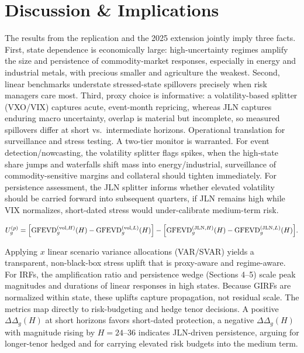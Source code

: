 \documentclass[
  11pt,
]{article}
\begin{document}
\section{Discussion \& Implications}\label{sec:discussion}

The results from the replication and the 2025 extension jointly imply three facts. First, state dependence is economically large: high-uncertainty regimes amplify the size and persistence of commodity-market responses, especially in energy and industrial metals, with precious smaller and agriculture the weakest. Second, linear benchmarks understate stressed-state spillovers precisely when risk managers care most. Third, proxy choice is informative: a volatility-based splitter (VXO/VIX) captures acute, event-month repricing, whereas JLN captures enduring macro uncertainty, overlap is material but incomplete, so measured spillovers differ at short vs.~intermediate horizons. Operational translation for surveillance and stress testing. A two-tier monitor is warranted. For event detection/nowcasting, the volatility splitter flags spikes, when the high-state share jumps and waterfalls shift mass into energy/industrial, surveillance of commodity-sensitive margins and collateral should tighten immediately. For persistence assessment, the JLN splitter informs whether elevated volatility should be carried forward into subsequent quarters, if JLN remains high while VIX normalizes, short-dated stress would under-calibrate medium-term risk.

\begin{equation}\label{eq:u-g-p}
U_g^{(p)}
=
\Bigl[
\mathrm{GFEVD}_g^{(\mathrm{vol},H)}(H)
-
\mathrm{GFEVD}_g^{(\mathrm{vol},L)}(H)
\Bigr]
-
\Bigl[
\mathrm{GFEVD}_g^{(\mathrm{JLN},H)}(H)
-
\mathrm{GFEVD}_g^{(\mathrm{JLN},L)}(H)
\Bigr].
\end{equation}

Applying \(x\) linear scenario variance allocations (VAR/SVAR) yields a transparent, non-black-box stress uplift that is proxy-aware and regime-aware. For IRFs, the amplification ratio and persistence wedge (Sections 4--5) scale peak magnitudes and durations of linear responses in high states. Because GIRFs are normalized within state, these uplifts capture propagation, not residual scale. The metrics map directly to risk-budgeting and hedge tenor decisions. A positive \(\Delta\Delta_g(H)\) at short horizons favors short-dated protection, a negative \(\Delta\Delta_g(H)\) with magnitude rising by \(H=24–36\) indicates JLN-driven persistence, arguing for longer-tenor hedged and for carrying elevated risk budgets into the medium term.
\end{document}
